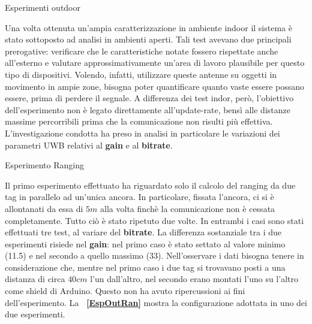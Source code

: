 \documentclass[12pt]{report}
\begin{document}
	\begin{section}{Esperimenti outdoor}

		Una volta ottenuta un'ampia caratterizzazione in ambiente indoor il sistema è stato sottoposto ad analisi in ambienti aperti. Tali test avevano due principali prerogative: verificare che le caratteristiche notate fossero rispettate anche all'esterno e valutare approssimativamente un'area di lavoro plausibile per questo 				tipo di dispositivi. Volendo, infatti, utilizzare queste antenne su oggetti in movimento in ampie zone, bisogna poter quantificare quanto vaste essere possano essere, prima di perdere il segnale. A differenza dei test indor, però, l'obiettivo dell'esperimento non è legato direttamente all'update-rate, bensì alle distanze 			massime percorribili prima che la comunicazione non risulti più effettiva. L'investigazione condotta ha preso in analisi in particolare le variazioni dei parametri UWB relativi al \textbf{gain} e al \textbf{bitrate}. 

		\begin{subsection}{Esperimento Ranging}

			Il primo esperimento effettuato ha riguardato solo il calcolo del ranging da due tag in parallelo ad un'unica ancora. In particolare, fissata l'ancora, ci si è allontanati da essa di $5m$ alla volta finchè la comunicazione non è cessata completamente. Tutto ciò è stato ripetuto due volte. In entrambi i casi sono stati 					effettuati tre test, al variare del \textbf{bitrate}. La differenza sostanziale tra i due esperimenti risiede nel \textbf{gain}: nel primo caso è stato settato al valore minimo (11.5) e nel secondo a quello massimo (33). Nell'osservare i dati bisogna tenere in considerazione che, mentre nel primo caso i due tag si 						trovavano posti a una distanza di circa $40cm$ l'un dall'altro, nel secondo erano montati l'uno su l'altro come shield di Arduino. Questo non ha avuto ripercussioni ai fini dell'esperimento. La  \textbf{\figurename~\ref{EspOutRan}} mostra la configurazione adottata in uno dei due esperimenti. 


\end{subsection}
\end{section}
\end{document}
